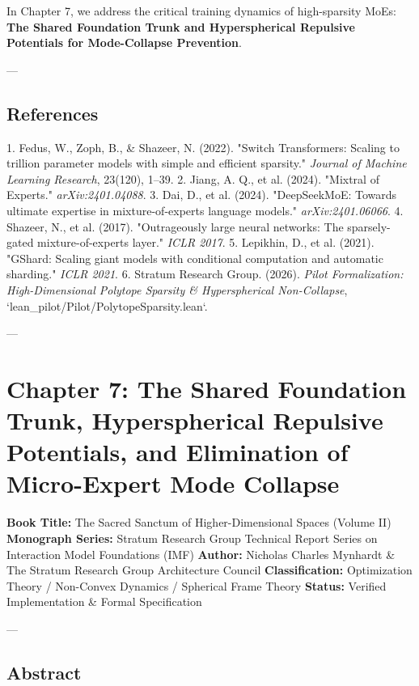 \documentclass[11pt,twoside,openright]{amsbook}
\begin{document}
{{{{{{{{In Chapter 7, we address the critical training dynamics of high-sparsity MoEs: \textbf{The Shared Foundation Trunk and Hyperspherical Repulsive Potentials for Mode-Collapse Prevention}.

---

\section{References}

1. Fedus, W., Zoph, B., & Shazeer, N. (2022). "Switch Transformers: Scaling to trillion parameter models with simple and efficient sparsity." \textit{Journal of Machine Learning Research}, 23(120), 1–39.
2. Jiang, A. Q., et al. (2024). "Mixtral of Experts." \textit{arXiv:2401.04088}.
3. Dai, D., et al. (2024). "DeepSeekMoE: Towards ultimate expertise in mixture-of-experts language models." \textit{arXiv:2401.06066}.
4. Shazeer, N., et al. (2017). "Outrageously large neural networks: The sparsely-gated mixture-of-experts layer." \textit{ICLR 2017}.
5. Lepikhin, D., et al. (2021). "GShard: Scaling giant models with conditional computation and automatic sharding." \textit{ICLR 2021}.
6. Stratum Research Group. (2026). \textit{Pilot Formalization: High-Dimensional Polytope Sparsity & Hyperspherical Non-Collapse}, `lean_pilot/Pilot/PolytopeSparsity.lean`.


---

\chapter{Chapter 7: The Shared Foundation Trunk, Hyperspherical Repulsive Potentials, and Elimination of Micro-Expert Mode Collapse}

\textbf{Book Title:} The Sacred Sanctum of Higher-Dimensional Spaces (Volume II)  
\textbf{Monograph Series:} Stratum Research Group Technical Report Series on Interaction Model Foundations (IMF)  
\textbf{Author:} Nicholas Charles Mynhardt & The Stratum Research Group Architecture Council  
\textbf{Classification:} Optimization Theory / Non-Convex Dynamics / Spherical Frame Theory  
\textbf{Status:} Verified Implementation & Formal Specification  

---

\section{Abstract}

}}}}}}}}
\end{document}
